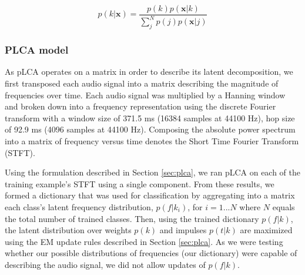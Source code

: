 \documentclass[a4paper,11pt,final]{ThesisStyle}
\begin{document}
\begin{equation}
p(k|\mathbf{x}) = \frac{p(k)p(\mathbf{x}|k)}{\sum_{j}^{N}p(j)p(\mathbf{x}|j)}  
\end{equation}

\subsubsection{PLCA model}

As pLCA operates on a matrix in order to describe its latent decomposition, we first transposed each audio signal into a matrix describing the magnitude of frequencies over time.  Each audio signal was multiplied by a Hanning window and broken down into a frequency representation using the discrete Fourier transform with a window size of 371.5 ms (16384 samples at 44100 Hz), hop size of 92.9 ms (4096 samples at 44100 Hz).  Composing the absolute power spectrum into a matrix of frequency versus time denotes the Short Time Fourier Transform (STFT).

Using the formulation described in Section \ref{sec:plca}, we ran pLCA on each of the training example's STFT using a single component.  From these results, we formed a dictionary that was used for classification by aggregating into a matrix each class's latent frequency distribution, $p(f|k_i)$, for $i = {1...N}$ where $N$ equals the total number of trained classes.  Then, using the trained dictionary $p(f|k)$, the latent distribution over weights $p(k)$ and impulses $p(t|k)$ are maximized using the EM update rules described in Section \ref{sec:plca}.  As we were testing whether our possible distributions of frequencies (our dictionary) were capable of describing the audio signal, we did not allow updates of $p(f|k)$.

\end{document}
